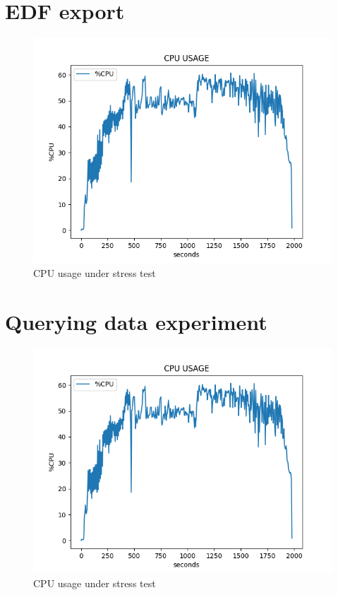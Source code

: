 \section{EDF export}
\begin{figure}
    \centering
    \includegraphics[width=1.0\textwidth]{Figures/StressTest.png}
    \caption{CPU usage under stress test}
    \label{fig:Figures/EDFEXP_RESULT}
\end{figure}
\section{Querying data experiment}
\begin{figure}
    \centering
    \includegraphics[width=1.0\textwidth]{Figures/StressTest.png}
    \caption{CPU usage under stress test}
    \label{fig:Figures/QUERYING_RESULT}
\end{figure}
